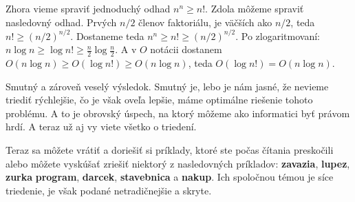 Zhora vieme spraviť jednoduchý odhad $n^n \geq n!$. Zdola môžeme spraviť nasledovný odhad. Prvých
$n/2$ členov faktoriálu, je väčších ako $n/2$, teda $n! \geq (n/2)^{n/2}$.
Dostaneme teda $n^n \geq n! \geq (n/2)^{n/2}$. 
Po zlogaritmovaní: $n\log n \geq \log n! \geq \frac{n}{2} \log \frac{n}{2}$. A v $O$ notácii
dostanem $O(n\log n) \geq O(\log n!) \geq O(n\log n)$, teda $O(\log n!) = O(n \log n)$.

Smutný a zároveň veselý výsledok. Smutný je, lebo je nám jasné, že nevieme triediť rýchlejšie, čo je
však oveľa lepšie, máme optimálne riešenie tohoto problému. A to je obrovský úspech, na
ktorý môžeme ako informatici byť právom hrdí. A teraz už aj vy viete všetko o triedení.

\medskip

Teraz sa môžete vrátiť a doriešiť si príklady, ktoré ste počas čítania preskočili alebo môžete
vyskúšať zriešiť niektorý z nasledovných príkladov: \textbf{zavazia}, \textbf{lupez}, \textbf{zurka}
\textbf{program}, \textbf{darcek}, \textbf{stavebnica} a \textbf{nakup}.
Ich spoločnou témou je síce triedenie, je však podané netradičnejšie a skryte.


